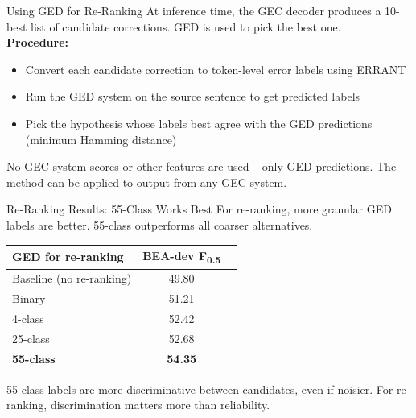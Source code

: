 \documentclass[aspectratio=169]{beamer}
\newcommand{\fhalf}{F\textsubscript{0.5}}
\begin{document}

\begin{frame}{Using GED for Re-Ranking}
  At inference time, the GEC decoder produces a 10-best list of candidate
  corrections. GED is used to pick the best one.\\[1.5em]

  \textbf{Procedure:}
  \begin{itemize}
    \item Convert each candidate correction to token-level error labels
      using ERRANT
    \item Run the GED system on the source sentence to get predicted labels
    \item Pick the hypothesis whose labels best agree with the GED predictions
      (minimum Hamming distance)
  \end{itemize}

  \vspace{1em}
  No GEC system scores or other features are used -- only GED predictions.
  The method can be applied to output from any GEC system.
\end{frame}

\begin{frame}{Re-Ranking Results: 55-Class Works Best}
  For re-ranking, more granular GED labels are better.
  55-class outperforms all coarser alternatives.\\[1em]

  \begin{center}
  \begin{tabular}{lcc}
    \toprule
    \textbf{GED for re-ranking} & \textbf{BEA-dev \fhalf} \\
    \midrule
    Baseline (no re-ranking) & 49.80 \\
    \midrule
    Binary & 51.21 \\
    4-class & 52.42 \\
    25-class & 52.68 \\
    \textbf{55-class} & \textbf{54.35} \\
    \bottomrule
  \end{tabular}
  \end{center}

  \vspace{0.5em}
  55-class labels are more discriminative between candidates,
  even if noisier. For re-ranking, discrimination matters more
  than reliability.
\end{frame}
\end{document}
